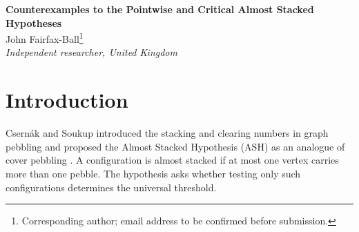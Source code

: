 \documentclass[10pt,a4paper]{article}
\begin{document}
\baselineskip=0.20in
\noindent
{}
\vskip36pt
\noindent
{\large\bf Counterexamples to the Pointwise and Critical Almost Stacked Hypotheses}\\[3mm]
\noindent
John Fairfax-Ball\footnote{Corresponding author; email address to be confirmed before submission.}\\[2mm]
\noindent
\footnotesize\textit{Independent researcher, United Kingdom}\\[5mm]
\setcounter{page}{1}\thispagestyle{empty}
\baselineskip=0.20in
\normalsize

\begin{abstract}
The Almost Stacked Hypothesis of Csern\'ak and Soukup has a printed
pointwise formulation and a natural critical (largest-losing-layer)
formulation. The former fails already for stacking on a four-vertex path
and clearing on a five-vertex bull graph. More substantially, a connected
non-bipartite nine-vertex graph refutes both clauses of the critical form.
Its stacking and clearing thresholds are $15$, but its only mass-$14$
losers are two non-almost-stacked automorphic configurations.
The decisive finite result has been certified using Lean and independently
reproducible reachability computations.
\par\medskip
{} graph pebbling; stacking number; clearing number;
counterexample; formal verification.\\[2mm]
05C57 (primary); 05C85 (secondary).
\end{abstract}

\section{Introduction}
Csern\'ak and Soukup introduced the stacking and clearing numbers in
graph pebbling and proposed the Almost Stacked Hypothesis (ASH) as an
analogue of cover pebbling \cite{CSApril,CSOctober}. A configuration is
almost stacked if at most one vertex carries more than one pebble.
The hypothesis asks whether testing only such configurations determines
the universal threshold.
\end{document}
